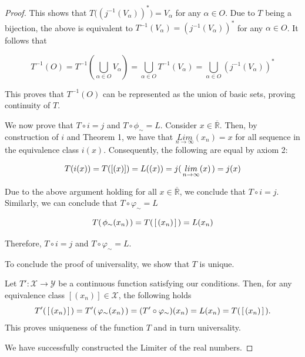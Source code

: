\documentclass{amsart}
\theoremstyle{definition}
\theoremstyle{plain}
\begin{document}
\begin{proof}
This shows  that $T\bigl((j^{-1}(V_{\alpha}))^*\bigr) = V_{\alpha}$ for any $\alpha \in O$. Due to $T$ being a bijection, the above is equivalent to $T^{-1}(V_{\alpha}) = (j^{-1}(V_{\alpha}))^{*}$ for any $\alpha \in O$. It follows that 


$$\displaystyle T^{-1}(O) = T^{-1} (\bigcup_{\alpha \in O} V_{\alpha}) = \bigcup_{\alpha \in O} T^{-1}(V_{\alpha}) = \bigcup_{\alpha \in O} (j^{-1}(V_{\alpha}))^*$$
 


This proves that $T^{-1}(O)$ can be represented as the union of basic sets, proving continuity of $T$.


We now prove that $T \circ i = j$ and $T \circ \phi_{\sim} = {L}.$
Consider $x \in \overline{\mathbb{R}}$. Then, by construction of $i$ and 
Theorem 1, we have that $\underset{n\to \infty}{Lim}(x_n) = x$ for all sequence in the equivalence class $i(x)$.
Consequently, the following are equal by axiom 2:



$$T(i(x))= T([(x)])={L}((x))=j(\hspace{0.5mm} \underset{n\to \infty}{lim}(x) \hspace{0.5mm}) = j(x)$$


Due to the above argument holding for all $x \in \overline{\mathbb{R}}$, we conclude that $T \circ i  = j$. Similarly, 
we can conclude that $T \circ \varphi_{\sim} = {L}$

$$T( \hspace{0.5mm}\phi_{\sim}(x_n)\hspace{0.5mm}) = T(\hspace{0.5mm}[\hspace{0.5mm}(x_n)\hspace{0.5mm}]\hspace{0.5mm}) = {L}(x_n)$$


\noindent Therefore,  $T \circ i = j$ and $T \circ \varphi_{\sim} = {L}$. 

To conclude the proof of universality, we show 
that $T$ is unique.

Let $T': \mathcal{X}  \to \mathcal{Y}$ be a continuous function satisfying our conditions. Then, for
any equivalence class $[(x_n)] \in \mathcal X$, the following holds
$$T'(\hspace{0.5mm}[\hspace{0.5mm}(x_n)\hspace{0.5mm}]\hspace{0.5mm}) = T'(\hspace{0.5mm} \varphi_{\sim}(x_n) \hspace{0.5mm} ) = (T'\circ \varphi_{\sim})(x_n) =  {L}(x_n) = T(\hspace{0.5mm}[\hspace{0.5mm}(x_n)\hspace{0.5mm}]\hspace{0.5mm}).$$
This proves 
uniqueness of the function $T$ and in turn universality. 

We have successfully constructed the Limiter of the real numbers. 
\end{proof}
\end{document}
